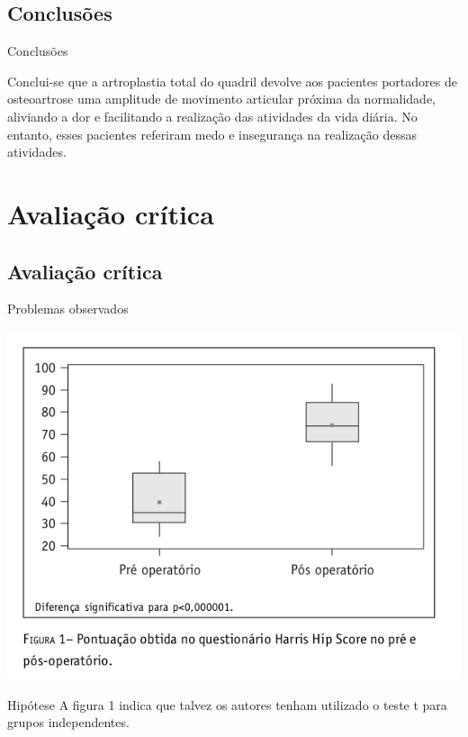 \documentclass{beamer}
\begin{document}
\subsection{Conclusões}

\begin{frame}{Conclusões}
  \begin{block}{}
    Conclui-se que a artroplastia total do quadril devolve aos pacientes portadores de osteoartrose uma amplitude de movimento articular próxima da normalidade, aliviando a dor e facilitando a realização das atividades da vida diária.
    No entanto, esses pacientes referiram medo e insegurança na realização dessas atividades.
  \end{block}
\end{frame}

\section{Avaliação crítica}

\subsection{Avaliação crítica}

\begin{frame}{Problemas observados}
  \begin{center}
    \includegraphics[height=.5\textheight]{figuras/figura1}
  \end{center}
  \begin{block}{Hipótese}
    A figura 1 indica que talvez os autores tenham utilizado o teste t para grupos independentes.
  \end{block}
\end{frame}
\end{document}
